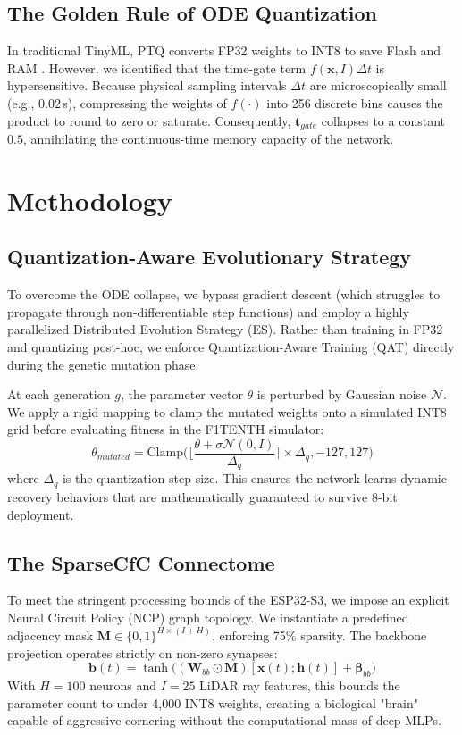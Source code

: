 \documentclass[lettersize,journal]{IEEEtran}
\begin{document}
\subsection{The Golden Rule of ODE Quantization}
In traditional TinyML, PTQ converts FP32 weights to INT8 to save Flash and RAM \cite{david2021tensorflow}. However, we identified that the time-gate term $f(\mathbf{x}, I)\Delta t$ is hypersensitive. Because physical sampling intervals $\Delta t$ are microscopically small (e.g., $0.02$\,s), compressing the weights of $f(\cdot)$ into 256 discrete bins causes the product to round to zero or saturate. Consequently, $\mathbf{t}_{gate}$ collapses to a constant $0.5$, annihilating the continuous-time memory capacity of the network.

\section{Methodology}

\subsection{Quantization-Aware Evolutionary Strategy}
To overcome the ODE collapse, we bypass gradient descent (which struggles to propagate through non-differentiable step functions) and employ a highly parallelized Distributed Evolution Strategy (ES). Rather than training in FP32 and quantizing post-hoc, we enforce Quantization-Aware Training (QAT) directly during the genetic mutation phase.

At each generation $g$, the parameter vector $\theta$ is perturbed by Gaussian noise $\mathcal{N}$. We apply a rigid mapping to clamp the mutated weights onto a simulated INT8 grid before evaluating fitness in the F1TENTH simulator:
\begin{equation}
    \theta_{mutated} = \text{Clamp}\Big( \lfloor \frac{\theta + \sigma \mathcal{N}(0, I)}{\Delta_{q}} \rceil \times \Delta_{q}, -127, 127 \Big)
\end{equation}
where $\Delta_{q}$ is the quantization step size. This ensures the network learns dynamic recovery behaviors that are mathematically guaranteed to survive 8-bit deployment.

\subsection{The SparseCfC Connectome}
To meet the stringent processing bounds of the ESP32-S3, we impose an explicit Neural Circuit Policy (NCP) graph topology. We instantiate a predefined adjacency mask $\mathbf{M} \in \{0,1\}^{H \times (I+H)}$, enforcing 75\% sparsity. The backbone projection operates strictly on non-zero synapses:
\begin{equation}
    \mathbf{b}(t) = \tanh\big( (\mathbf{W}_{bb} \odot \mathbf{M}) [\mathbf{x}(t) ; \mathbf{h}(t)] + \mathbf{\beta}_{bb} \big)
\end{equation}
With $H=100$ neurons and $I=25$ LiDAR ray features, this bounds the parameter count to under 4,000 INT8 weights, creating a biological "brain" capable of aggressive cornering without the computational mass of deep MLPs.
\end{document}
